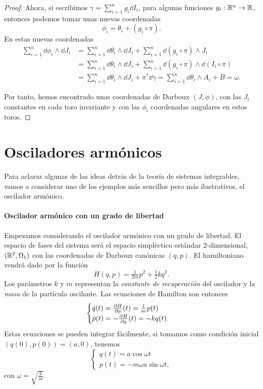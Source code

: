 \begin{proof}
Ahora, si escribimos $\gamma= \sum_{i=1}^n g_i \dd I_i$, para algunas funciones $g_i:\mathbb{R}^n \rightarrow \mathbb{R}$, entonces podemos tomar unas nuevas coordenadas 
\[
  \phi_i= \theta_i + (g_i \circ \pi).
\]
En estas nuevas coordenadas
\[
\begin{split}
  \sum_{i=1}^n \dd \phi_i \wedge \dd J_i & = \sum_{i=1}^n \dd \theta_i \wedge \dd J_i + \sum_{i=1}^n \dd(g_i \circ \pi) \wedge J_i \\
   & =\sum_{i=1}^n \dd \theta_i \wedge \dd J_i + \sum_{i=1}^n \dd(g_i \circ \pi) \wedge \dd (I_i \circ \pi) \\
   & =\sum_{i=1}^n \dd \theta_i \wedge \dd J_i + \pi^* \dd \gamma = \sum_{i=1}^n \dd \theta_i \wedge A_i + B = \omega.
\end{split}
\]

Por tanto, hemos encontrado unas coordenadas de Darboux $(J,\phi)$, con las $J_i$ constantes en cada toro invariante y con las $\phi_i$ coordenadas angulares en estos toros. 
\end{proof}

\section{Osciladores armónicos}
Para aclarar algunas de las ideas detrás de la teoría de sistemas integrables, vamos a considerar uno de los ejemplos más sencillos pero más ilustrativos, el oscilador armónico.

\paragraph{\bf Oscilador armónico con un grado de libertad}\mbox{}

  Empezamos considerando el oscilador armónico con un grado de libertad. El espacio de fases del sistema será el espacio simpléctico estándar $2$-dimensional, $(\mathbb{R}^2,\Omega_1)$ con las coordenadas de Darboux canónicas $(q,p)$. El hamiltoniano vendrá dado por la función
  \begin{equation*}
    H(q,p)=\tfrac{1}{2m}p^2+\tfrac{1}{2}kq^2.
  \end{equation*}
  Los parámetros $k$ y $m$ representan la \emph{constante de recuperación} del oscilador y la \emph{masa} de la partícula oscilante.
  Las ecuaciones de Hamilton son entonces
  \begin{equation*}
    \begin{cases}
      \dot q(t) = \frac{\partial H}{\partial p}(t)=\tfrac{1}{m}p(t)\\
    \dot p(t) = -\frac{\partial H}{\partial q}(t)=-kq(t).
  \end{cases}
  \end{equation*}
  Estas ecuaciones se pueden integrar fácilmente, si tomamos como condición inicial $(q(0),p(0))=(a,0)$, tenemos
  \begin{equation*}
    \begin{cases}
   q(t)=a\cos\omega t \\ 
   p(t)=-m\omega a\sin\omega t,
 \end{cases}
  \end{equation*}
  con $\omega=\sqrt{\frac{k}{m}}$.
  

